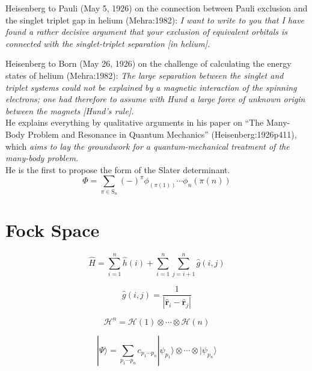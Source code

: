 Heisenberg to Pauli (May 5, 1926) on the connection between Pauli exclusion and
the singlet triplet gap in helium (Mehra:1982):
{\itshape
    I want to write to you that I have found a rather decisive argument that
    your exclusion of equivalent orbitals is connected with the singlet-triplet
    separation [in helium].
}

Heisenberg to Born (May 26, 1926) on the challenge of calculating the energy
states of helium (Mehra:1982):
{\itshape
    The large separation between the singlet and triplet systems could not be
    explained by a magnetic interaction of the spinning electrons; one had
    therefore to assume with Hund a large force of unknown origin between the
    magnets [Hund's rule].
}
\\
He explains everything by qualitative arguments in his paper on ``The Many-Body
Problem and Resonance in Quantum Mechanics'' (Heisenberg:1926p411), which
{\itshape
    aims to lay the groundwork for a quantum-mechanical treatment of the
    many-body problem.
}
\\
He is the first to propose the form of the Slater determinant.
\begin{equation}
    \Phi
    =
    \sum_{\pi\in\mathrm{S}_n}
    (-)^\pi
    \phi_(\pi(1))
    \cdots
    \phi_n(\pi(n))
\end{equation}



\section{Fock Space}

\begin{equation}
    \hat{H}
    =
    \sum_{i=1}^n
    \hat{h}(i)
    +
    \sum_{i=1}^n
    \sum_{j=i+1}^n
    \hat{g}(i,j)
\end{equation}

\begin{equation}
    \hat{g}(i,j)
    =
    \frac{1}{|\hat{\mathbf{r}}_i-\hat{\mathbf{r}}_j|}
\end{equation}

\begin{equation}
    \mathcal{H}^n
    =
    \mathcal{H}(1)\otimes\cdots\otimes\mathcal{H}(n)
\end{equation}

\begin{equation}
    |\Psi\rangle
    =
    \sum_{p_1\cdots p_n}
    c_{p_1\cdots p_n}
    |\psi_{p_1}\rangle
    \otimes
    \cdots
    \otimes
    |\psi_{p_n}\rangle
\end{equation}
